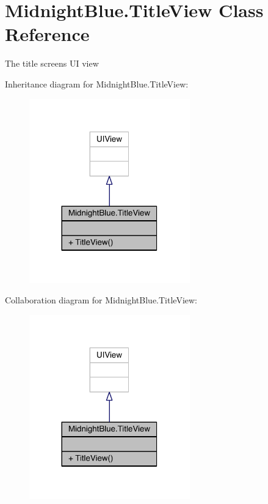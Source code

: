 \hypertarget{class_midnight_blue_1_1_title_view}{}\section{Midnight\+Blue.\+Title\+View Class Reference}
\label{class_midnight_blue_1_1_title_view}


The title screens UI view  




Inheritance diagram for Midnight\+Blue.\+Title\+View\+:
\nopagebreak
\begin{figure}[H]
\begin{center}
\leavevmode
\includegraphics[width=197pt]{class_midnight_blue_1_1_title_view__inherit__graph}
\end{center}
\end{figure}


Collaboration diagram for Midnight\+Blue.\+Title\+View\+:
\nopagebreak
\begin{figure}[H]
\begin{center}
\leavevmode
\includegraphics[width=197pt]{class_midnight_blue_1_1_title_view__coll__graph}
\end{center}
\end{figure}
